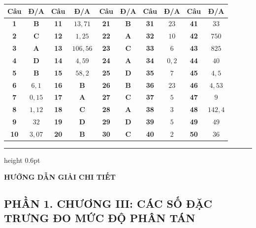 \documentclass[12pt,a4paper]{article}
\begin{document}
\begin{center}
\renewcommand{\arraystretch}{1.2}
\begin{tabular}{|c|c||c|c||c|c||c|c||c|c|}
\hline
\textbf{Câu} & \textbf{Đ/A} & \textbf{Câu} & \textbf{Đ/A} & \textbf{Câu} & \textbf{Đ/A} & \textbf{Câu} & \textbf{Đ/A} & \textbf{Câu} & \textbf{Đ/A} \\ \hline
\textbf{1} & \textbf{B} & \textbf{11} & $13{,}71$ & \textbf{21} & \textbf{B} & \textbf{31} & $23$ & \textbf{41} & $33$ \\ \hline
\textbf{2} & \textbf{C} & \textbf{12} & $1{,}25$ & \textbf{22} & \textbf{A} & \textbf{32} & $10$ & \textbf{42} & $750$ \\ \hline
\textbf{3} & \textbf{A} & \textbf{13} & $106{,}56$ & \textbf{23} & \textbf{C} & \textbf{33} & $6$ & \textbf{43} & $825$ \\ \hline
\textbf{4} & \textbf{D} & \textbf{14} & $4{,}59$ & \textbf{24} & \textbf{A} & \textbf{34} & $0{,}2$ & \textbf{44} & $40$ \\ \hline
\textbf{5} & \textbf{B} & \textbf{15} & $58{,}2$ & \textbf{25} & \textbf{D} & \textbf{35} & $7$ & \textbf{45} & $4{,}5$ \\ \hline
\textbf{6} & $6{,}1$ & \textbf{16} & \textbf{B} & \textbf{26} & \textbf{B} & \textbf{36} & $23$ & \textbf{46} & $4{,}53$ \\ \hline
\textbf{7} & $0{,}15$ & \textbf{17} & \textbf{A} & \textbf{27} & \textbf{C} & \textbf{37} & $5$ & \textbf{47} & $9$ \\ \hline
\textbf{8} & $1{,}12$ & \textbf{18} & \textbf{C} & \textbf{28} & \textbf{A} & \textbf{38} & $3$ & \textbf{48} & $142{,}4$ \\ \hline
\textbf{9} & $32$ & \textbf{19} & \textbf{D} & \textbf{29} & \textbf{D} & \textbf{39} & $5$ & \textbf{49} & $49$ \\ \hline
\textbf{10} & $3{,}07$ & \textbf{20} & \textbf{B} & \textbf{30} & \textbf{C} & \textbf{40} & $2$ & \textbf{50} & $36$ \\ \hline
\end{tabular}
\end{center}

\vspace{10pt}
\hrule height 0.6pt
\vspace{10pt}

\begin{center}
    {\fontsize{13}{15}\selectfont\textbf{HƯỚNG DẪN GIẢI CHI TIẾT}}
\end{center}

\subsection*{PHẦN 1. CHƯƠNG III: CÁC SỐ ĐẶC TRƯNG ĐO MỨC ĐỘ PHÂN TÁN}
\end{document}
